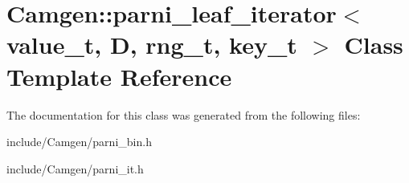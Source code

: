 \hypertarget{a00396}{}\section{Camgen\+:\+:parni\+\_\+leaf\+\_\+iterator$<$ value\+\_\+t, D, rng\+\_\+t, key\+\_\+t $>$ Class Template Reference}
\label{a00396}


The documentation for this class was generated from the following files\+:\begin{DoxyCompactItemize}
\item 
include/\+Camgen/parni\+\_\+bin.\+h\item 
include/\+Camgen/parni\+\_\+it.\+h\end{DoxyCompactItemize}
